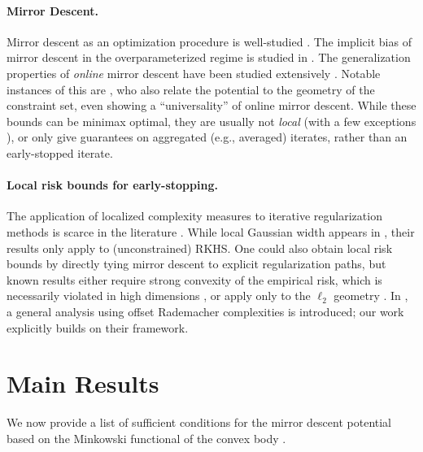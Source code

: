 \documentclass[a4paper]{article}
\theoremstyle{thmstyle}
\theoremstyle{defstyle}
\theoremstyle{remark}
\begin{document}
\paragraph{Mirror Descent.} Mirror descent as an optimization procedure is well-studied \citep{Beck2003mirror,Shalev2007online,Agarwal2012information}. The implicit bias of mirror descent in the overparameterized regime is studied in \cite{Gunasekar2018, Sun2023unified}.
The generalization properties of \emph{online} mirror descent have been studied extensively \citep{Shalev2007online,Orabona2023modern, Lattimore2024bandit,bach2024learning}.
Notable instances of this are \cite{srebro2011universality,Levy2019necessary,gatmiry2024computing}, who also relate the potential to the geometry of the constraint set, even showing a ``universality'' of online mirror descent. While these bounds can be minimax optimal, they are usually not \emph{local} (with a few exceptions \citep{rakhlin2013localization}), or only give guarantees on aggregated (e.g., averaged) iterates, rather than an early-stopped iterate.

\paragraph{Local risk bounds for early-stopping.}
The application of localized complexity measures to iterative regularization methods is scarce in the literature \citep{Yao2007,Raskutti2011early}. While local Gaussian width appears in \citet{Wei2018early}, their results only apply to (unconstrained) RKHS. 
One could also obtain local risk bounds by directly tying mirror descent to explicit regularization paths, but known results either require strong convexity of the empirical risk, which is necessarily violated in high dimensions \citep[Section 4]{Suggala2018connecting}, or apply only to the $\ell_2$ geometry \citep{Ali2019continuous}.
In \cite{Kanade2023earlystopped}, a general analysis using offset Rademacher complexities is introduced; our work explicitly builds on their framework.


\section{Main Results}
\label{sec:main-result}


We now provide a list of sufficient conditions for the mirror descent potential based on the Minkowski functional of the convex body \citep{Bonnesen_1934}.
\end{document}
